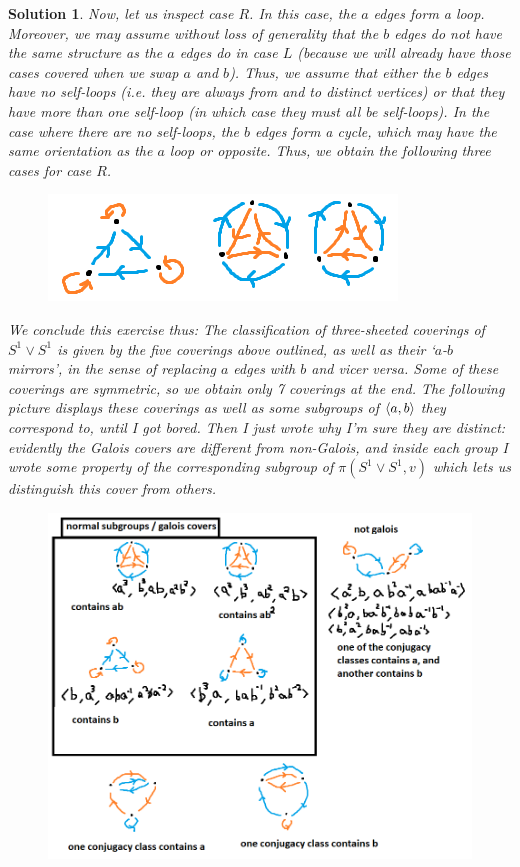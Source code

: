 \documentclass{article}
\theoremstyle{plain}
\theoremstyle{nonumberplain}
\newtheorem{sol}{Solution}
\DeclarePairedDelimiter{\braket}{\langle}{\rangle}
\begin{document}
\begin{sol}
Now, let us inspect case $R$. In this case, the $a$ edges form a loop. Moreover, we may assume without loss of generality that the $b$ edges do not have the same structure as the $a$ edges do in case $L$ (because we will already have those cases covered when we swap $a$ and $b$). Thus, we assume that either the $b$ edges have no self-loops (i.e. they are always from and to distinct vertices) or that they have more than one self-loop (in which case they must all be self-loops). In the case where there are no self-loops, the $b$ edges form a cycle, which may have the same orientation as the $a$ loop or opposite. Thus, we obtain the following three cases for case $R$.
\begin{figure}[H]
\centering
\includegraphics[width=\linewidth]{cov5}
\end{figure}

We conclude this exercise thus: The classification of three-sheeted coverings of $S^1 \vee S^1$ is given by the five coverings above outlined, as well as their `$a$-$b$ mirrors', in the sense of replacing $a$ edges with $b$ and vicer versa. Some of these coverings are symmetric, so we obtain only 7 coverings at the end. The following picture displays these coverings as well as some subgroups of $\braket{a,b}$ they correspond to, until I got bored. Then I just wrote why I'm sure they are distinct: evidently the Galois covers are different from non-Galois, and inside each group I wrote some property of the corresponding subgroup of $\pi(S^1 \vee S^1, v)$ which lets us distinguish this cover from others.
\begin{figure}[H]
\centering
\includegraphics[width=\linewidth]{cov6}
\end{figure}
\end{sol}
\end{document}
